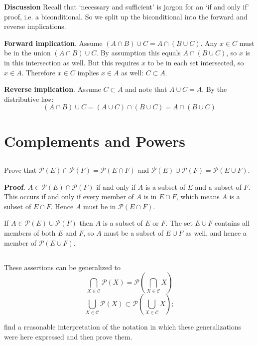 \documentclass{article}
\begin{document}
\textbf{Discussion} Recall that `necessary and sufficient' is jargon for an `if and only if' proof, i.e. a biconditional. So we split up the biconditional into the forward and reverse implications.

\textbf{Forward implication}. Assume $(A \cap B) \cup C = A \cap (B \cup C)$. Any $x \in C$ must be in the union $(A \cap B) \cup C$. By assumption this equals $A \cap (B \cup C)$, so $x$ is in this intersection as well. But this requires $x$ to be in each set intersected, so $x \in A$. Therefore $x \in C$ implies $x \in A$ as well: $C \subset A$.

\textbf{Reverse implication}. Assume $C \subset A$ and note that $A \cup C = A$. By the distributive law:
$$(A \cap B) \cup C = (A \cup C) \cap (B \cup C) = A \cap (B \cup C)$$

\section{Complements and Powers}

\subsection{} Prove that $\mathscr{P}(E) \cap \mathscr{P}(F) = \mathscr{P}(E \cap F)$ and $\mathscr{P}(E) \cup \mathscr{P}(F) = \mathscr{P}(E \cup F)$.

\textbf{Proof}. $A \in \mathscr{P}(E) \cap \mathscr{P}(F)$ if and only if $A$ is a subset of $E$ and a subset of $F$. This occurs if and only if every member of $A$ is in $E \cap F$, which means $A$ is a subset of $E \cap F$. Hence $A$ must be in $\mathscr{P}(E \cap F)$.

If $A \in \mathscr{P}(E) \cup \mathscr{P}(F)$ then $A$ is a subset of $E$ or $F$. The set $E \cup F$ contains all members of both $E$ and $F$, so $A$ must be a subset of $E \cup F$ as well, and hence a member of $\mathscr{P}(E \cup F)$. 

\subsection{} These assertions can be generalized to 
$$ \bigcap_{X \in \mathcal{C}} \mathscr{P}(X) = \mathscr{P}\left(\bigcap_{X \in \mathcal{C}} X\right)$$
$$ \bigcup_{X \in \mathcal{C}} \mathscr{P}(X) \subset \mathscr{P}\left(\bigcup_{X \in \mathcal{C}} X\right);$$

find a reasonable interpretation of the notation in which these generalizations were here expressed and then prove them.
\end{document}
